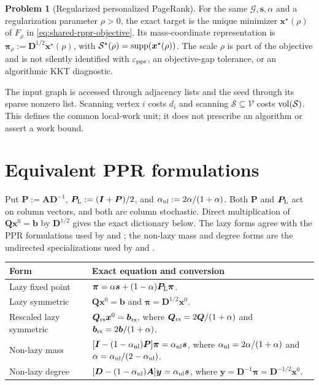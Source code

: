 \documentclass[11pt]{article}
\theoremstyle{definition}
\newtheorem{problem}[theorem]{Problem}
\theoremstyle{remark}
\theoremstyle{plain}
\begin{document}
\begin{problem}[Regularized personalized PageRank]
\label{prob:problem-definitions-rppr}
For the same $\mathcal{G},\bm{s},\alpha$ and a regularization parameter
$\rho>0$, the exact target is the unique minimizer $\bm{x}^\star(\rho)$ of
$F_\rho$ in \cref{eq:shared-rppr-objective}. Its mass-coordinate
representation is $\bm{\pi}_\rho:=\bm{D}^{1/2}\bm{x}^\star(\rho)$, with
$\mathcal{S}^\star(\rho)=\operatorname{supp}(\bm{x}^\star(\rho))$.
The scale $\rho$ is part of the objective and is not silently identified with
$\varepsilon_{\mathrm{ppr}}$, an objective-gap tolerance, or an algorithmic KKT diagnostic.
\end{problem}

The input graph is accessed through adjacency lists and the seed through its
sparse nonzero list.  Scanning vertex $i$ costs $d_i$ and scanning
$\mathcal{S}\subseteq\mathcal{V}$ costs $\operatorname{vol}(\mathcal{S})$. This defines
the common local-work unit; it does not prescribe an algorithm or assert a
work bound.

\section{Equivalent PPR formulations}
\label{sec:problem-definitions-equivalences}

Put $\bm{P}:=\bm{A}\bm{D}^{-1}$,
$\bm{P}_{\rm L}:=(\bm{I}+\bm{P})/2$, and
$\alpha_{\rm nl}:=2\alpha/(1+\alpha)$.
Both $\bm{P}$ and $\bm{P}_{\rm L}$ act on column vectors, and both are
column stochastic. Direct multiplication of
$\bm{Q}\bm{x}^0=\bm{b}$ by $\bm{D}^{1/2}$ gives the exact dictionary below.
The lazy forms agree with the PPR formulations used by
\citet{zhou2024iterative} and \citet{huang2025accelerated}; the non-lazy mass
and degree forms are the undirected specializations used by
\citet{chen2023accelerating} and \citet{wei2026simple}.

\begin{center}
\begin{tabularx}{0.97\textwidth}{@{}
    >{\raggedright\arraybackslash}p{}
    >{\raggedright\arraybackslash}X@{}}
\toprule
Form & Exact equation and conversion \\
\midrule
Lazy fixed point
& $\bm{\pi}=\alpha\bm{s}
   +(1-\alpha)\bm{P}_{\rm L}\bm{\pi}$. \\
Lazy symmetric
& $\bm{Q}\bm{x}^0=\bm{b}$ and
  $\bm{\pi}=\bm{D}^{1/2}\bm{x}^0$. \\
Rescaled lazy symmetric
& $\bm{Q}_{\rm rs}\bm{x}^0=\bm{b}_{\rm rs}$, where
  $\bm{Q}_{\rm rs}=2\bm{Q}/(1+\alpha)$ and
  $\bm{b}_{\rm rs}=2\bm{b}/(1+\alpha)$. \\
Non-lazy mass
& $[\bm{I}-(1-\alpha_{\rm nl})\bm{P}]\bm{\pi}
   =\alpha_{\rm nl}\bm{s}$, where
  $\alpha_{\rm nl}=2\alpha/(1+\alpha)$ and
  $\alpha=\alpha_{\rm nl}/(2-\alpha_{\rm nl})$. \\
Non-lazy degree
& $[\bm{D}-(1-\alpha_{\rm nl})\bm{A}]\bm{y}
   =\alpha_{\rm nl}\bm{s}$, where
  $\bm{y}=\bm{D}^{-1}\bm{\pi}
   =\bm{D}^{-1/2}\bm{x}^0$. \\
\bottomrule
\end{tabularx}
\end{center}
\end{document}
